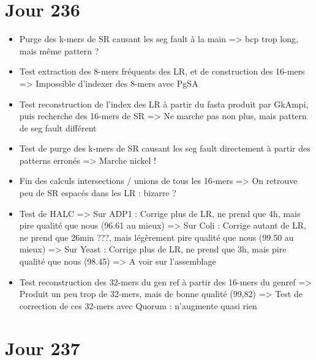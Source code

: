 \documentclass[12pt]{report}
\begin{document}
\section{Jour 236}

\begin{itemize}
	\item Purge des k-mers de SR causant les seg fault à la main => bcp trop long, mais même pattern ?

	\item Test extraction des 8-mers fréquents des LR, et de construction des 16-mers
		  => Impossible d'indexer des 8-mers avec PgSA
		  
	\item Test reconstruction de l'index des LR à partir du fasta produit par GkAmpi,
		  puis recherche des 16-mers de SR => Ne marche pas non plus, mais pattern de seg fault différent
		  
	\item Test de purge des k-mers de SR causant les seg fault directement à partir des patterns erronés
		  => Marche nickel !
		  
	\item Fin des calculs intersections / unions de tous les 16-mers
		  => On retrouve peu de SR espacés dans les LR : bizarre ?
	
	\item Test de HALC
		  => Sur ADP1 : Corrige plus de LR, ne prend que 4h, mais pire qualité que nous (96.61 au mieux)
		  => Sur Coli : Corrige autant de LR, ne prend que 26min ???, mais légèrement pire qualité que nous (99.50 au mieux)
		  => Sur Yeast : Corrige plus de LR, ne prend que 3h, mais pire qualité que nous (98.45)
		  => A voir sur l'assemblage
	
	\item Test reconstruction des 32-mers du gen ref à partir des 16-mers du genref
		  => Produit un peu trop de 32-mers, mais de bonne qualité (99,82)
		  => Test de correction de ces 32-mers avec Quorum : n'augmente quasi rien
\end{itemize}

\section{Jour 237}
\end{document}
